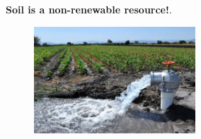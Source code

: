 \begin{frame}
\begin{minipage}{0.6\textwidth}
\begin{itemize}
			      \textbf{Soil is a non-renewable resource!}.
		\end{itemize}
	\end{minipage}
	\begin{minipage}{0.37\textwidth}
		\begin{figure}[ht!]
			\centering
			\includegraphics[height=4cm]{wasted_water}
		\end{figure}
	\end{minipage}
\end{frame}

